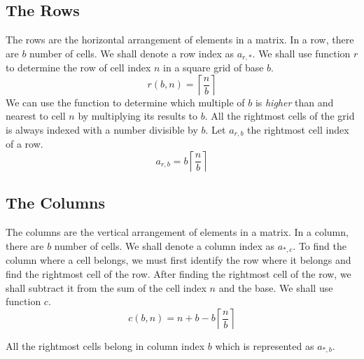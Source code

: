 \documentclass[letterpaper, twoside,12pt]{article}
\begin{document}
    \subsection{The Rows} \label{rows}
    The rows are the horizontal arrangement of elements in a matrix. In a row, there are $b$ number of cells. We shall denote a row index as $a_{r,*}$. We shall use function $r$ to determine the row of cell index $n$ in a square grid of base $b$.
    \begin{equation}
        r(b,n) = \left\lceil \frac{n}{b} \right\rceil
    \end{equation}
    We can use the function to determine which multiple of $b$ is \emph{higher} than and nearest to cell $n$ by multiplying its results to $b$. All the rightmost cells of the grid is always indexed with a number divisible by $b$. Let $a_{r,b}$ the rightmost cell index of a row.
    \begin{equation}
        a_{r,b} = b\left\lceil \frac{n}{b} \right\rceil
    \end{equation}

    \subsection{The Columns} \label{columns}
    The columns are the vertical arrangement of elements in a matrix. In a column, there are $b$ number of cells. We shall denote a column index as $a_{*,c}$. To find the column where a cell belongs, we must first identify the row where it belongs and find the rightmost cell of the row. After finding the rightmost cell of the row, we shall subtract it from the sum of the cell index $n$ and the base. We shall use function $c$.
    \begin{equation}
        c(b,n) = n + b - b\left\lceil \frac{n}{b} \right\rceil
    \end{equation}

    All the rightmost cells belong in column index $b$ which is represented as $a_{*,b}$.

    \newpage
\end{document}
